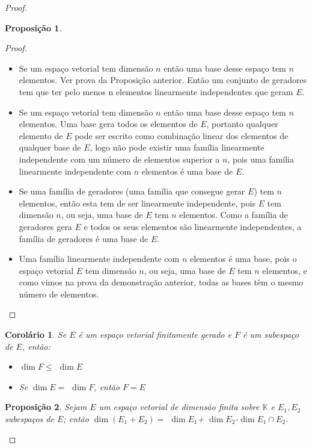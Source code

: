 \documentclass{article}
\newtheorem{corollary}{Corolário}[section]
\newtheorem{proposition}{Proposição}[section]
\begin{document}
\begin{proof}
\begin{proposition}
\begin{itemize}
		\end{itemize}
	\end{proposition}

	\begin{proof}
    		\begin{itemize}
	    		\item Se um espaço vetorial tem dimensão $n$ então uma base desse espaço tem $n$ elementos. Ver prova da Proposição anterior. Então um conjunto de geradores tem que ter pelo menos n elementos linearmente independentes que geram $E$.
			\item Se um espaço vetorial tem dimensão $n$ então uma base desse espaço tem $n$ elementos. Uma base gera todos os elementos de $E$, portanto qualquer elemento de $E$ pode ser escrito como combinação linear dos elementos de qualquer base de  $E$, logo não pode existir uma família linearmente independente com um número de elementos superior a $n$, pois uma família linearmente independente com $n$ elementos é uma base de $E$.
			\item Se uma família de geradores (uma família que consegue gerar $E$) tem $n$ elementos, então esta tem de ser linearmente independente, pois $E$ tem dimensão $n$, ou seja, uma base de $E$ tem $n$ elementos. Como a família de geradores gera $E$ e todos os seus elementos são linearmente independentes, a família de geradores é uma base de $E$.
			\item Uma família linearmente independente com $n$ elementos é uma base, pois o espaço vetorial $E$ tem dimensão $n$, ou seja, uma base de $E$ tem $n$ elementos, e como vimos na prova da demonstração anterior, todas as bases têm o mesmo número de elementos.
    		\end{itemize}
	\end{proof}


\begin{corollary}
    Se $E$ é um espaço vetorial finitamente gerado e $F$ é um subespaço de $E$, então:
\begin{itemize}
    \item $\dim F\leq $ $\dim E$
    \item Se $\dim E=$ $\dim F$, então $F=E$
\end{itemize}

\end{corollary}

\begin{proposition}
  Sejam $E$ um espaço vetorial de dimensão finita sobre $\mathbb{K}$ e $E_1,E_2$ subespaços de $E$; então $\dim (E_1+E_2)=$ $\dim E_1$+ $\dim E_2$-$\dim E_1\cap E_2$.
  

\end{proposition}
\end{proof}
\end{document}
